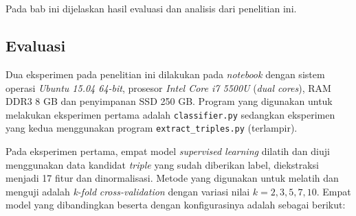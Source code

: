 \chapter{\babEmpat}
\label{chap:babEmpat}

Pada bab ini dijelaskan hasil evaluasi dan analisis dari penelitian ini.

\section{Evaluasi}

Dua eksperimen pada penelitian ini dilakukan pada \textit{notebook} dengan sistem operasi \textit{Ubuntu 15.04 64-bit}, prosesor \textit{Intel Core i7 5500U} (\textit{dual cores}), RAM DDR3 8 GB dan penyimpanan SSD 250 GB. Program yang digunakan untuk melakukan eksperimen pertama adalah \verb|classifier.py| sedangkan eksperimen yang kedua menggunakan program \verb|extract_triples.py| (terlampir).

Pada eksperimen pertama, empat model \textit{supervised learning} dilatih dan diuji menggunakan data kandidat \textit{triple} yang sudah diberikan label, diekstraksi menjadi 17 fitur dan dinormalisasi. Metode yang digunakan untuk melatih dan menguji adalah \textit{k-fold} \textit{cross-validation} \citep{kohavi1995study} dengan variasi nilai $k = {2, 3, 5, 7, 10}$. Empat model yang dibandingkan beserta dengan konfigurasinya adalah sebagai berikut:

